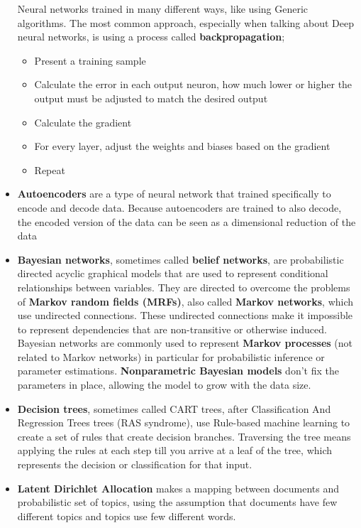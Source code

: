 \begin{itemize}
		Neural networks trained in many different ways, like using Generic algorithms. The most common approach, especially when talking about Deep neural networks, is using a process called \textbf{backpropagation};
		\begin{itemize}
			\item Present a training sample
			\item Calculate the error in each output neuron, how much lower or higher the output must be adjusted to match the desired output
			\item Calculate the gradient
			\item For every layer, adjust the weights and biases based on the gradient
			\item Repeat
		\end{itemize}
	\item \textbf{Autoencoders}
		are a type of neural network that trained specifically to encode and decode data. Because autoencoders are trained to also decode, the encoded version of the data can be seen as a dimensional reduction of the data
	\item \textbf{Bayesian networks}, 
		sometimes called \textbf{belief networks}, are probabilistic directed acyclic graphical models\cite{Wain08}\cite{Kol09}\cite{Xin16} that are used to represent conditional relationships between variables. They are directed to overcome the problems of \textbf{Markov random
		fields (MRFs)}, also called \textbf{Markov networks}, which use undirected connections. These undirected connections make it impossible to represent dependencies that are non-transitive or otherwise induced. Bayesian networks are commonly used to represent \textbf{Markov processes} (not related to Markov networks) in particular for probabilistic inference or parameter estimations.
		\textbf{Nonparametric Bayesian models}\cite{Grif05}\cite{Teh06} don't fix the parameters in place, allowing the model to grow with the data size.
	\item \textbf{Decision trees},
		sometimes called CART trees, after Classification And Regression Trees trees (RAS syndrome), use Rule-based machine learning to create a set of rules that create decision branches. Traversing the tree means applying the rules at each step till you arrive at a leaf of the tree, which represents the decision or classification for that input.
	\item \textbf{Latent Dirichlet Allocation}\cite{Blei03}
		makes a mapping between documents and probabilistic set of topics, using the assumption that documents have few different topics and topics use few different words.

\end{itemize}
